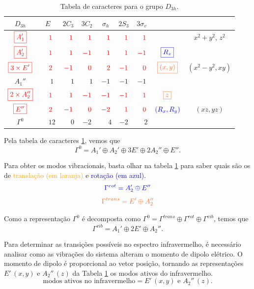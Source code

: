 \documentclass[a4paper,10pt]{article}
\renewcommand{\p}{\phantom{+}}
\renewcommand{\c}[1]{\textcolor{red}{#1}}
\begin{document}
\begin{table}[H]
\caption{Tabela de caracteres para o grupo $D_{3h}$.}
\centering
\begin{tabular} { |c|c c c c c c | c | c | }
\hline
$D_{3h}$ & $E$ & $2 C_{3}$ & $3 C_{2}$ & $\sigma_h$ & $2 S_3$ & $3 \sigma_v$ & & \\
\hline
$\c{\boxed{A_1'}}$  & $\c{\p1}$ & $\c{\p1}$ & $\c{\p1}$ & $\c{\p1}$ & $\c{\p1}$ & $\c{\p1}$ & & $x^2+y^2$, $z^2$ \\
$\c{\boxed{A_2'}}$  & $\c{\p1}$ & $\c{\p1}$ & $\c{ -1}$ & $\c{\p1}$ & $\c{\p1}$ & $\c{ -1}$ & $\textcolor{blue}{\boxed{R_z}}$ &  \\
$\c{\boxed{3\times E'}}$    & $\c{\p2}$ & $\c{ -1}$ & $\c{\p0}$ & $\c{\p2}$ & $\c{ -1}$ & $\c{\p0}$ & $\textcolor{Orange}{\boxed{(x,y)}}$ & $(x^2-y^2, xy)$ \\
$A_1''$ & $\p1$ & $\p1$ & $\p1$ & $ -1$ & $ -1$ & $ -1$ & & \\
$\c{\boxed{2\times A_2''}}$ & $\c{\p1}$ & $\c{\p1}$ & $\c{ -1}$ & $\c{ -1}$ & $\c{ -1}$ & $\c{\p1}$ & $\textcolor{Orange}{\boxed{z}}$ & \\
$\c{\boxed{E''}}$   & $\c{\p2}$ & $\c{ -1}$ & $\c{\p0}$ & $\c{ -2}$ & $\c{\p1}$ & $\c{\p0}$ & $\textcolor{blue}{(R_x,R_y)}$ & $(xz,yz)$ \\
\hline
\hline
$\Gamma^0$ & $\p12$ & $\p0$ & $ -2$ & $\p4$ & $ -2$ & $\p2$ & & \\
\hline
\end{tabular}
\label{tab:D3h}
\end{table}

Pela tabela de caracteres \ref{tab:D3h}, vemos que
$$
\boxed{ \Gamma^0 = A_1' \oplus A_2' \oplus 3E' \oplus 2A_2'' \oplus E''. }
$$

Para obter os modos vibracionais, basta olhar na tabela \ref{tab:D3h} para saber quais são os de \textcolor{Orange}{translação (em laranja)} e \textcolor{blue}{rotação (em azul)}.
$$
\textcolor{blue}{\Gamma^{rot} = A_2' \oplus E''}
$$
$$
\textcolor{Orange}{\Gamma^{trans} = E' \oplus A_2''}
$$

Como a representação $\Gamma^0$ é decomposta como $\Gamma^0 = \Gamma^{trans} \oplus \Gamma^{rot} \oplus \Gamma^{vib}$, temos que
$$
\boxed{\Gamma^{vib} = A_1' \oplus 2 E' \oplus A_2''.}
$$

Para determinar as transições possíveis no espectro infravermelho, é necessário analisar como as vibrações do sistema alteram o momento de dipolo elétrico. O momento de dipolo é proporcional ao vetor posição, tornando as representações $E' \, (x,y)$ e $A_2'' \, (z)$ da Tabela \ref{tab:D3h} os modos ativos do infravermelho.
$$
\text{modos ativos no infravermelho} =
E' \, (x,y) \text{ e } A_2'' \, (z).
$$
\end{document}
